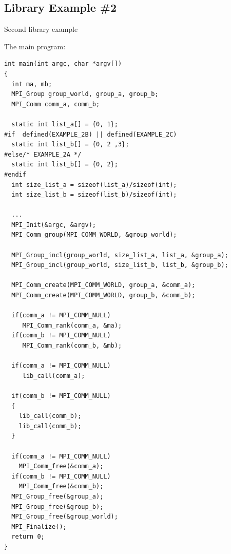 \subsection{Library Example \#2}
\begin{example}
\label{context-ex6}
%
Second library example

\noindent The main program:
\begin{lstlisting}[language={[MPI]C}]
int main(int argc, char *argv[])
{
  int ma, mb;
  MPI_Group group_world, group_a, group_b;
  MPI_Comm comm_a, comm_b;

  static int list_a[] = {0, 1};
#if  defined(EXAMPLE_2B) || defined(EXAMPLE_2C)
  static int list_b[] = {0, 2 ,3};
#else/* EXAMPLE_2A */
  static int list_b[] = {0, 2};
#endif
  int size_list_a = sizeof(list_a)/sizeof(int);
  int size_list_b = sizeof(list_b)/sizeof(int);

  ...
  MPI_Init(&argc, &argv);
  MPI_Comm_group(MPI_COMM_WORLD, &group_world);

  MPI_Group_incl(group_world, size_list_a, list_a, &group_a);
  MPI_Group_incl(group_world, size_list_b, list_b, &group_b);

  MPI_Comm_create(MPI_COMM_WORLD, group_a, &comm_a);
  MPI_Comm_create(MPI_COMM_WORLD, group_b, &comm_b);

  if(comm_a != MPI_COMM_NULL)
     MPI_Comm_rank(comm_a, &ma);
  if(comm_b != MPI_COMM_NULL)
     MPI_Comm_rank(comm_b, &mb);

  if(comm_a != MPI_COMM_NULL)
     lib_call(comm_a);

  if(comm_b != MPI_COMM_NULL)
  {
    lib_call(comm_b);
    lib_call(comm_b);
  }

  if(comm_a != MPI_COMM_NULL)
    MPI_Comm_free(&comm_a);
  if(comm_b != MPI_COMM_NULL)
    MPI_Comm_free(&comm_b);
  MPI_Group_free(&group_a);
  MPI_Group_free(&group_b);
  MPI_Group_free(&group_world);
  MPI_Finalize();
  return 0;
}
\end{lstlisting}


\end{example}
